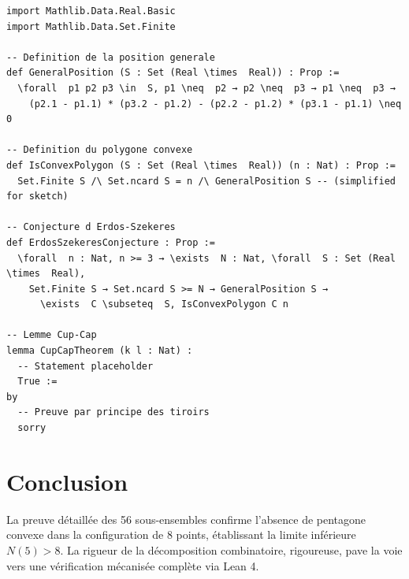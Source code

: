 \documentclass[11pt]{article}
\begin{document}
\begin{verbatim}
import Mathlib.Data.Real.Basic
import Mathlib.Data.Set.Finite

-- Definition de la position generale
def GeneralPosition (S : Set (Real \times  Real)) : Prop :=
  \forall  p1 p2 p3 \in  S, p1 \neq  p2 → p2 \neq  p3 → p1 \neq  p3 →
    (p2.1 - p1.1) * (p3.2 - p1.2) - (p2.2 - p1.2) * (p3.1 - p1.1) \neq  0

-- Definition du polygone convexe
def IsConvexPolygon (S : Set (Real \times  Real)) (n : Nat) : Prop :=
  Set.Finite S /\ Set.ncard S = n /\ GeneralPosition S -- (simplified for sketch)

-- Conjecture d Erdos-Szekeres
def ErdosSzekeresConjecture : Prop :=
  \forall  n : Nat, n >= 3 → \exists  N : Nat, \forall  S : Set (Real \times  Real),
    Set.Finite S → Set.ncard S >= N → GeneralPosition S →
      \exists  C \subseteq  S, IsConvexPolygon C n

-- Lemme Cup-Cap
lemma CupCapTheorem (k l : Nat) :
  -- Statement placeholder
  True :=
by
  -- Preuve par principe des tiroirs
  sorry
\end{verbatim}

\section{Conclusion}
La preuve détaillée des 56 sous-ensembles confirme l'absence de pentagone convexe dans la configuration de 8 points, établissant la limite inférieure $N(5) > 8$. La rigueur de la décomposition combinatoire, rigoureuse, pave la voie vers une vérification mécanisée complète via Lean 4.
\end{document}

